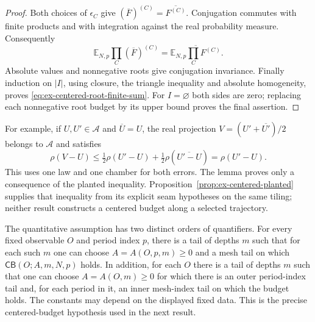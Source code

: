 \begin{proof}
Both choices of $\epsilon_C$ give
$(\overline F)^{(C)}=\overline{F^{(C)}}$. Conjugation commutes with
finite products and with integration against the real probability
measure. Consequently
\[
 \mathbb E_{N,p}\prod_C(\overline F)^{(C)}
 =\overline{\mathbb E_{N,p}\prod_CF^{(C)}}.
\]
Absolute values and nonnegative roots give conjugation invariance.
Finally induction on $|I|$, using closure, the triangle inequality and
absolute homogeneity, proves \eqref{eq:ex-centered-root-finite-sum}.
For $I=\varnothing$ both sides are zero; replacing each nonnegative
root budget by its upper bound proves the final assertion.
\end{proof}

For example, if $U,U'\in\mathcal A$ and $\overline U=U$, the real
projection $V=(U'+\overline{U'})/2$ belongs to $\mathcal A$ and satisfies
\[
 \rho(V-U)
 \leq\tfrac12\rho(U'-U)+\tfrac12\rho(\overline{U'-U})
 =\rho(U'-U).
\]
This uses one law and one chamber for both errors. The lemma proves only
a consequence of the planted inequality. Proposition~\ref{prop:ex-centered-planted}
supplies that inequality from its explicit seam hypotheses on the same tiling;
neither result constructs a centered budget along a selected trajectory.

The quantitative assumption has two distinct orders of quantifiers. For every fixed observable $O$ and period index $p$, there is a tail of depths $m$ such that for each such $m$ one can choose $A=A(O,p,m)\geq0$ and a mesh tail on which $\mathsf{CB}(O;A,m,N,p)$ holds. In addition, for each $O$ there is a tail of depths $m$ such that one can choose $A=A(O,m)\geq0$ for which there is an outer period-index tail and, for each period in it, an inner mesh-index tail on which the budget holds. The constants may depend on the displayed fixed data. This is the precise centered-budget hypothesis used in the next result.

